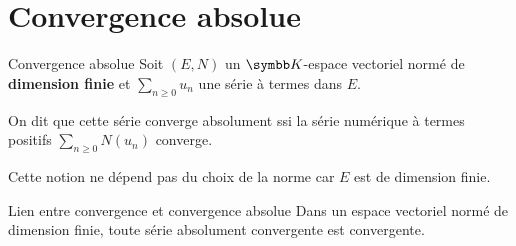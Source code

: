 \section{Convergence absolue}

\begin{definition}{Convergence absolue}{}
    Soit $(E, N)$ un $\K$-espace vectoriel normé de \textbf{dimension finie} et $\sum_{n \geqslant 0} u_n$
    une série à termes dans $E$. 

    On dit que cette série converge absolument ssi la série numérique à termes positifs 
    $\sum_{n \geqslant 0} N(u_n)$ converge. 
\end{definition}

\begin{remarque}
    Cette notion ne dépend pas du choix de la norme car $E$ est de dimension finie.
\end{remarque}

\begin{theoreme}{Lien entre convergence et convergence absolue}{}
    Dans un espace vectoriel normé de dimension finie, toute série absolument convergente est convergente.
\end{theoreme}



